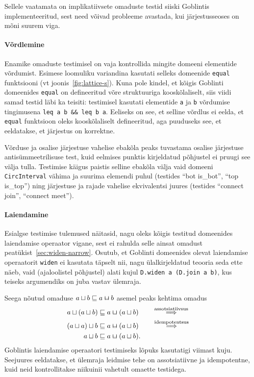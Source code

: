\documentclass[../thesis.tex]{subfiles}
\begin{document}
Sellele vaatamata on implikatiivsete omaduste testid siiski Goblintis implementeeritud, sest need võivad probleeme avastada, kui järjestusseoses on mõni suurem viga.

\paragraph{Võrdlemine}
Enamike omaduste testimisel on vaja kontrollida mingite domeeni elementide võrdumist. Esimese loomuliku variandina kasutati selleks domeenide \texttt{equal} funktsiooni (vt joonis~\ref{fig:lattice-s}). Kuna pole kindel, et kõigis Goblinti domeenides \texttt{equal} on defineeritud võre struktuuriga kooskõlaliselt, siis viidi samad testid läbi ka teisiti: testimisel kasutati elementide \texttt{a} ja \texttt{b} võrdumise tingimusena \texttt{leq a b \&\& leq b a}. Eeliseks on see, et selline võrdlus ei eelda, et \texttt{equal} funktsioon oleks kooskõlaliselt defineeritud, aga puuduseks see, et eeldatakse, et järjestus on korrektne.

Võrduse ja osalise järjestuse vahelise ebakõla peaks tuvastama osalise järjestuse antisümmeetrilisuse test, kuid eelmises punktis kirjeldatud põhjustel ei pruugi see välja tulla. Testimise käigus paistis selline ebakõla välja vaid domeeni \texttt{CircInterval} vähima ja suurima elemendi puhul (testides \enquote{bot is\_bot}, \enquote{top is\_top}) ning järjestuse ja rajade vahelise ekvivalentsi juures (testides \enquote{connect join}, \enquote{connect meet}).

\paragraph{Laiendamine}
Esialgse testimise tulemused näitasid, nagu oleks kõigis testitud domeenides laiendamise operaator vigane, sest ei rahulda selle ainsat omadust peatükist~\ref{sec:widen-narrow}. Osutub, et Goblinti domeenides olevat laiendamise operaatorit \texttt{widen} ei kasutata täpselt nii, nagu ülalkirjeldatud teooria seda ette näeb, vaid (ajaloolistel põhjustel) alati kujul \texttt{D.widen a (D.join a b)}, kus teiseks argumendiks on juba vastav ülemraja.

Seega nõutud omaduse $a \sqcup b \sqleq a \widen b$ asemel peaks kehtima omadus
\begin{align*}
	a \sqcup (a \sqcup b) &\sqleq a \widen (a \sqcup b) \qquad\stackrel{\text{assotsiatiivsus}}{\Longrightarrow} \\
	(a \sqcup a) \sqcup b &\sqleq a \widen (a \sqcup b) \qquad\stackrel{\text{idempotentsus}}{\Longrightarrow} \\
	a \sqcup b &\sqleq a \widen (a \sqcup b).
\end{align*}
Goblintis laiendamise operaatori testimiseks lõpuks kasutatigi viimast kuju. Seejuures eeldatakse, et ülemraja leidmise tehe on assotsiatiivne ja idempotentne, kuid neid kontrollitakse niikuinii vahetult omaette testidega.
\end{document}
